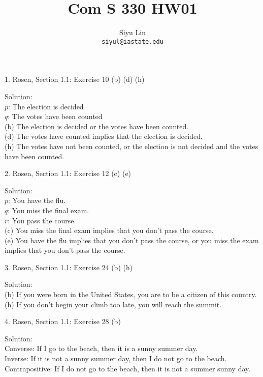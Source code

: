 \documentclass[12pt]{article}
\title{Com S 330 HW01}
\author{Siyu Lin \\ \texttt{siyul@iastate.edu}}
\begin{document}
\maketitle

1. Rosen, Section 1.1: Exercise 10 (b) (d) (h)

\indent Solution:\\
\indent $p$: The election is decided\\
\indent $q$: The votes have been counted\\
\indent (b) The election is decided or the votes have been counted.\\
\indent (d) The votes have counted implies that the election is decided.\\
\indent (h) The votes have not been counted, or the election is not decided and the votes have been counted.\\
\newline

2. Rosen, Section 1.1: Exercise 12 (c) (e)

\indent Solution:\\
\indent $p$: You have the flu.\\
\indent $q$: You miss the final exam.\\
\indent $r$: You pass the course.\\
\indent (c) You miss the final exam implies that you don’t pass the course.\\
\indent (e) You have the flu implies that you don’t pass the course, or you miss the exam implies that you don’t pass the course. \\
\newline

3. Rosen, Section 1.1: Exercise 24 (b) (h)

\indent Solution:\\
\indent (b) If you were born in the United States, you are to be a citizen of this country.\\
\indent (h) If you don’t begin your climb too late, you will reach the summit.\\
\newline

4. Rosen, Section 1.1: Exercise 28 (b)

\indent Solution:\\
\indent Converse: If I go to the beach, then it is a sunny summer day.\\
\indent Inverse: If it is not a sunny summer day, then I do not go to the beach.\\
\indent Contrapositive: If I do not go to the beach, then it is not a summer sunny day.\\
\newline
\end{document}
